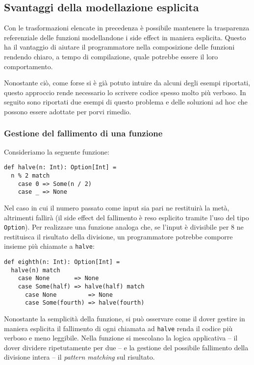 \subsection{Svantaggi della modellazione esplicita}
\label{svantaggi-della-modellazione-esplicita}
Con le trasformazioni elencate in precedenza è possibile mantenere la trasparenza referenziale delle funzioni modellandone i side effect in maniera esplicita. Questo ha il vantaggio di aiutare il programmatore nella composizione delle funzioni rendendo chiaro, a tempo di compilazione, quale potrebbe essere il loro comportamento.

Nonostante ciò, come forse si è già potuto intuire da alcuni degli esempi riportati, questo approccio rende necessario lo scrivere codice spesso molto più verboso.
In seguito sono riportati due esempi di questo problema e delle soluzioni ad hoc che possono essere adottate per porvi rimedio.

\subsubsection{Gestione del fallimento di una funzione}
Consideriamo la seguente funzione:
\begin{lstlisting}[language=scala3]
def halve(n: Int): Option[Int] =
  n % 2 match
    case 0 => Some(n / 2)
    case _ => None 
\end{lstlisting}
Nel caso in cui il numero passato come input sia pari ne restituirà la metà, altrimenti fallirà (il side effect del fallimento è reso esplicito tramite l'uso del tipo \lstinline{Option}). Per realizzare una funzione analoga che, se l'input è divisibile per 8 ne restituisca il risultato della divisione, un programmatore potrebbe comporre insieme   più chiamate a \lstinline{halve}:
\begin{lstlisting}[language=scala3]
def eighth(n: Int): Option[Int] =
  halve(n) match
    case None       => None
    case Some(half) => halve(half) match
      case None         => None
      case Some(fourth) => halve(fourth)
\end{lstlisting}
Nonostante la semplicità della funzione, si può osservare come il dover gestire in maniera esplicita il fallimento di ogni chiamata ad \lstinline{halve} renda il codice più verboso e meno leggibile. Nella funzione si mescolano la logica applicativa -- il dover dividere ripetutamente per due -- e la gestione del possibile fallimento della divisione intera -- il \emph{pattern matching} sul risultato.

